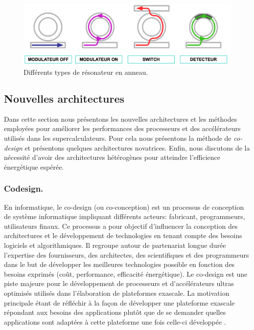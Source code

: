         \begin{figure}
            \center
            \includegraphics[width=14cm]{images/edl_photo_ring.png}
            \caption{\label{fig:edl_photo_ring} Différents types de résonateur en anneau.}
        \end{figure}


\subsection{Nouvelles architectures}\label{sec:new_soc}
    
    Dans cette section nous présentons les nouvelles architectures et les méthodes employées pour améliorer les performances des processeurs et des accélérateurs utilisés dans les supercalculateurs. Pour cela nous présentons la méthode de \textit{co-design} et présentons quelques architectures novatrices. Enfin, nous  discutons de la nécessité d'avoir des architectures hétérogènes pour atteindre l'efficience énergétique espérée.
    
    \subsubsection{Codesign.}\label{sec:codesign}
        
        En informatique, le co-design (ou co-conception) est un processus de conception de système informatique impliquant différents acteurs: fabricant, programmeurs, utilisateurs finaux. Ce processus a pour objectif d'influencer la conception des architectures et le développement de technologies en tenant compte des besoins logiciels et algorithmiques. Il regroupe autour de partenariat longue durée l'expertise des fournisseurs, des architectes, des scientifiques et des programmeurs dans le but de développer les meilleures technologies possible en fonction des besoins exprimés (coût, performance, efficacité énergétique). Le co-design est une piste majeure pour le développement de processeurs et d'accélérateurs ultras optimisés utilisés dans l'élaboration de plateformes \gls{exascale}. La motivation principale étant de réfléchir à la façon de développer une plateforme exascale répondant aux besoins des applications plutôt que de se demander quelles applications sont adaptées à cette plateforme une fois celle-ci développée \cite{PARKERe2013}.
        
